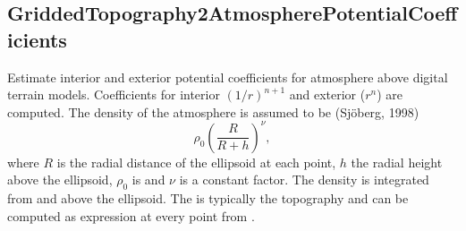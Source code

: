 \subsection{GriddedTopography2AtmospherePotentialCoefficients}\label{GriddedTopography2AtmospherePotentialCoefficients}
Estimate interior and exterior potential coefficients for atmosphere above digital terrain models.
Coefficients for interior $(1/r)^{n+1}$ and exterior ($r^n$) are computed.
The density of the atmosphere is assumed to be (Sjöberg, 1998)
\begin{equation}
\rho_0\left(\frac{R}{R+h}\right)^\nu,
\end{equation}
where $R$ is the radial distance of the ellipsoid at each point, $h$ the radial height above the ellipsoid,
$\rho_0$ is  and  $\nu$ is a constant factor. The density is integrated
from  and  above the ellipsoid.
The  is typically the topography and can be computed as expression at every point
from .


